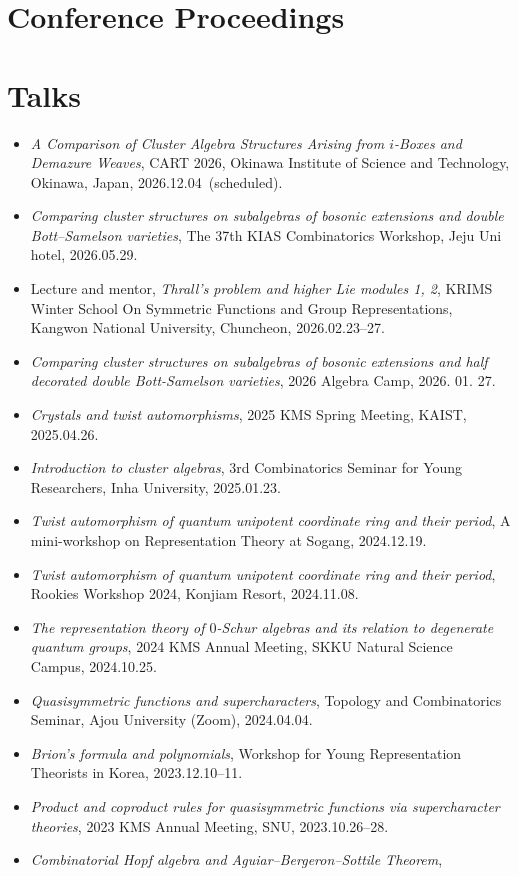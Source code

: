 \documentclass[11pt,a4paper]{article}
\newcommand{\cvsection}[1]{\Needspace{4\baselineskip}\section*{#1}}
\begin{document}
\cvsection{Conference Proceedings}


\cvsection{Talks}
\begin{itemize}
\item \emph{A Comparison of Cluster Algebra Structures Arising from $i$-Boxes and Demazure Weaves},
  CART 2026, Okinawa Institute of Science and Technology, Okinawa, Japan,\newline
  \mbox{2026.12.04 (scheduled)}.
\item \emph{Comparing cluster structures on subalgebras of bosonic extensions and double Bott--Samelson varieties},
  The 37th KIAS Combinatorics Workshop, Jeju Uni hotel, 2026.05.29.
\item Lecture and mentor, \emph{Thrall's problem and higher Lie modules 1, 2},
  KRIMS Winter School On Symmetric Functions and Group Representations,
  Kangwon National University, Chuncheon, 2026.02.23--27.
\item \emph{Comparing cluster structures on subalgebras of bosonic extensions and half decorated double Bott-Samelson varieties},
  2026 Algebra Camp, 2026. 01. 27.
\item \emph{Crystals and twist automorphisms},
  2025 KMS Spring Meeting, KAIST, 2025.04.26.
\item \emph{Introduction to cluster algebras},
  3rd Combinatorics Seminar for Young Researchers, Inha University, 2025.01.23.
\item \emph{Twist automorphism of quantum unipotent coordinate ring and their period},
  A mini-workshop on Representation Theory at Sogang, 2024.12.19.
\item \emph{Twist automorphism of quantum unipotent coordinate ring and their period},
  Rookies Workshop 2024, Konjiam Resort, 2024.11.08.
\item \emph{The representation theory of $0$-Schur algebras and its relation to degenerate quantum groups},
  2024 KMS Annual Meeting, SKKU Natural Science Campus, 2024.10.25.
\item \emph{Quasisymmetric functions and supercharacters},
  Topology and Combinatorics Seminar, Ajou University (Zoom), 2024.04.04.
\item \emph{Brion's formula and polynomials},
  Workshop for Young Representation Theorists in Korea, 2023.12.10--11.
\item \emph{Product and coproduct rules for quasisymmetric functions via supercharacter theories},
  2023 KMS Annual Meeting, SNU, 2023.10.26--28.
\item \emph{Combinatorial Hopf algebra and Aguiar--Bergeron--Sottile Theorem},

\end{itemize}
\end{document}
